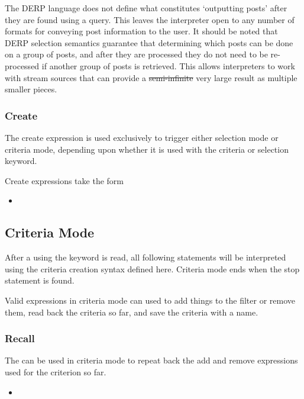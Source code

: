 The DERP language does not define what constitutes ‘outputting posts’ after they are found using a query.
This leaves the interpreter open to any number of formats for conveying post information to the user.
It should be noted that DERP selection semantics guarantee that determining which posts can be done on a
group of posts, and after they are processed they do not need to be re-processed if another group of posts
is retrieved. This allows interpreters to work with stream sources that can provide a \st{semi-infinite} very
large result as multiple smaller pieces.

\subsubsection{Create}
The create expression is used exclusively to trigger either selection mode or criteria mode, depending upon
whether it is used with the criteria or selection keyword.

Create expressions take the form
\begin{itemize}[leftmargin=2in]
    \item[\nonterminal{create\_expression}] \bnf{:}    \bnf{(} \bnf{|} \bnf{)}
\end{itemize}

\subsection{Criteria Mode}
After a  using the keyword  is read, all following statements will be interpreted using
the criteria creation syntax defined here. Criteria mode ends when the stop statement is found.

Valid expressions in criteria mode can used to add things to the filter or remove them, read back the criteria so
far, and save the criteria with a name.

\subsubsection{Recall}
The  can be used in criteria mode to repeat back the add and remove expressions used for the
criterion so far.
\begin{itemize}[leftmargin=2in]
    \item[\nonterminal{recall\_expression}] \bnf{:} 
\end{itemize}

